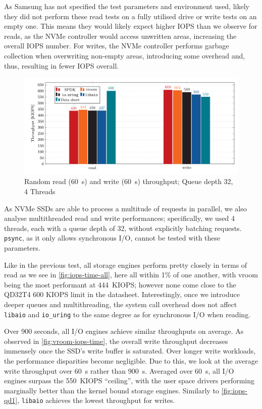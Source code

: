 As Samsung has not specified the test parameters and environment used, likely they did not perform these read tests on a fully utilised drive or write tests on an empty one. This means they would likely expect higher IOPS than we observe for reads, as the NVMe controller would access unwritten areas, increasing the overall IOPS number. For writes, the NVMe controller performs garbage collection when overwriting non-empty areas, introducing some overhead and, thus, resulting in fewer IOPS overall.


\begin{figure}
  \centering
    \includegraphics[width=\textwidth]{figures/iops-qd32-ybar}
    \caption{Random read (\qty{60}{\second}) and write (\qty{60}{\second}) throughput; Queue depth 32, 4 Threads}
    \label{fig:iops-qd32}
\end{figure}

As NVMe SSDs are able to process a multitude of requests in parallel, we also analyse multithreaded read and write performances; specifically, we used 4 threads, each with a queue depth of 32, without explicitly batching requests. \texttt{psync}, as it only allows synchronous I/O, cannot be tested with these parameters.

Like in the previous test, all storage engines perform pretty closely in terms of read as we see in \autoref{fig:iops-time-all}, here all within 1\% of one another, with vroom being the most performant at \qty{444}{KIOPS}; however none come close to the QD32T4 600 KIOPS limit in the datasheet. Interestingly, once we introduce deeper queues and multithreading, the system call overhead does not affect \texttt{libaio} and \texttt{io\_uring} to the same degree as for synchronous I/O when reading.

Over 900 seconds, all I/O engines achieve similar throughputs on average. As observed in \autoref{fig:vroom-iops-time}, the overall write throughput decreases immensely once the SSD's write buffer is saturated. Over longer write workloads, the performance disparities become negligible. Due to this, we look at the average write throughput over \qty{60}{\second} rather than \qty{900}{\second}. Averaged over \qty{60}{\second}, all I/O engines surpass the \qty{550}{KIOPS} ``ceiling'', with the user space drivers performing marginally better than the kernel bound storage engines. Similarly to \autoref{fig:iops-qd1}, \texttt{libaio} achieves the lowest throughput for writes.

